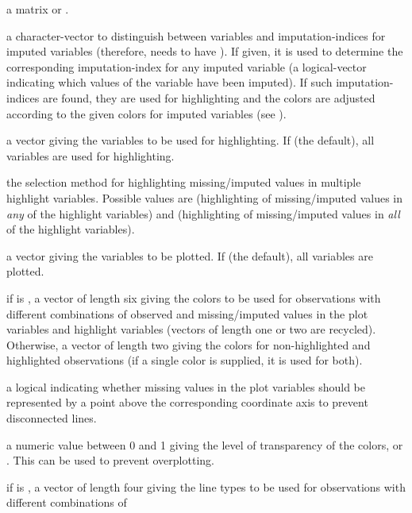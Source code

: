 \begin{Arguments}
\begin{ldescription}
\item[\code{x}] a matrix or .
\item[\code{delimiter}] a character-vector to distinguish between variables
and imputation-indices for imputed variables (therefore,  needs
to have ). If given, it is used to determine the corresponding
imputation-index for any imputed variable (a logical-vector indicating
which values of the variable have been imputed). If such imputation-indices
are found, they are used for highlighting and the colors are adjusted 
according to the given colors for imputed variables (see ).
\item[\code{highlight}] a vector giving the variables to be used for highlighting.  
If  (the default), all variables are used for highlighting.
\item[\code{selection}] the selection method for highlighting missing/imputed values in 
multiple highlight variables.  Possible values are  
(highlighting of missing/imputed values in \emph{any} of the highlight variables) 
and  (highlighting of missing/imputed values in \emph{all} of the 
highlight variables).
\item[\code{plotvars}] a vector giving the variables to be plotted.  If  
(the default), all variables are plotted.
\item[\code{col}] if  is , a vector of length six giving 
the colors to be used for observations with different combinations of 
observed and missing/imputed values in the plot variables and highlight variables 
(vectors of length one or two are recycled).  Otherwise, a vector of length 
two giving the colors for non-highlighted and highlighted observations (if 
a single color is supplied, it is used for both).
\item[\code{plotNA}] a logical indicating whether missing values in the plot 
variables should be represented by a point above the corresponding 
coordinate axis to prevent disconnected lines.
\item[\code{alpha}] a numeric value between 0 and 1 giving the level of transparency 
of the colors, or .  This can be used to prevent overplotting.
\item[\code{lty}] if  is , a vector of length four giving 
the line types to be used for observations with different combinations of 

\end{ldescription}
\end{Arguments}
